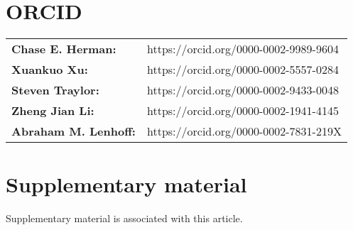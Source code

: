\documentclass[preprint,review,12pt]{elsarticle}
\begin{document}


\section*{ORCID}
    \begin{tabular}{l l}
    \textbf{Chase E. Herman:} & https://orcid.org/0000-0002-9989-9604 \\
    \textbf{Xuankuo Xu:} & https://orcid.org/0000-0002-5557-0284 \\
    \textbf{Steven Traylor:} & https://orcid.org/0000-0002-9433-0048 \\
    \textbf{Zheng Jian Li:} & https://orcid.org/0000-0002-1941-4145 \\
    \textbf{Abraham M. Lenhoff:} & https://orcid.org/0000-0002-7831-219X \\
    \end{tabular}

\section*{Supplementary material}
    Supplementary material is associated with this article.
\end{document}
